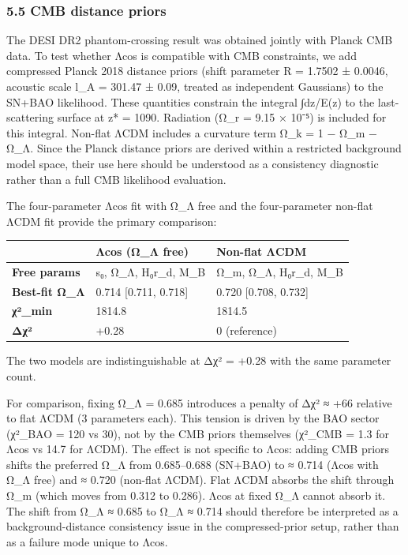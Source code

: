 \subsubsection{5.5 CMB distance priors}\label{cmb-distance-priors}

The DESI DR2 phantom-crossing result was obtained jointly with Planck
CMB data. To test whether Λcos is compatible with CMB constraints, we
add compressed Planck 2018 distance priors (shift parameter R = 1.7502 ±
0.0046, acoustic scale l\_A = 301.47 ± 0.09, treated as independent
Gaussians) to the SN+BAO likelihood. These quantities constrain the
integral ∫dz/E(z) to the last-scattering surface at z* = 1090. Radiation
(Ω\_r = 9.15 × 10⁻⁵) is included for this integral. Non-flat ΛCDM
includes a curvature term Ω\_k = 1 − Ω\_m − Ω\_Λ. Since the Planck
distance priors are derived within a restricted background model space,
their use here should be understood as a consistency diagnostic rather
than a full CMB likelihood evaluation.

The four-parameter Λcos fit with Ω\_Λ free and the four-parameter
non-flat ΛCDM fit provide the primary comparison:

{\def\LTcaptype{none} %
\begin{longtable}[]{@{}lll@{}}
\toprule\noalign{}
& Λcos (Ω\_Λ free) & Non-flat ΛCDM \\
\midrule\noalign{}
\endhead
\bottomrule\noalign{}
\endlastfoot
\textbf{Free params} & s₀, Ω\_Λ, H₀r\_d, M\_B & Ω\_m, Ω\_Λ, H₀r\_d,
M\_B \\
\textbf{Best-fit Ω\_Λ} & 0.714 {[}0.711, 0.718{]} & 0.720 {[}0.708,
0.732{]} \\
\textbf{χ²\_min} & 1814.8 & 1814.5 \\
\textbf{Δχ²} & +0.28 & 0 (reference) \\
\end{longtable}
}

The two models are indistinguishable at Δχ² = +0.28 with the same
parameter count.

For comparison, fixing Ω\_Λ = 0.685 introduces a penalty of Δχ² ≈ +66
relative to flat ΛCDM (3 parameters each). This tension is driven by the
BAO sector (χ²\_BAO = 120 vs 30), not by the CMB priors themselves
(χ²\_CMB = 1.3 for Λcos vs 14.7 for ΛCDM). The effect is not specific to
Λcos: adding CMB priors shifts the preferred Ω\_Λ from 0.685--0.688
(SN+BAO) to ≈ 0.714 (Λcos with Ω\_Λ free) and ≈ 0.720 (non-flat ΛCDM).
Flat ΛCDM absorbs the shift through Ω\_m (which moves from 0.312 to
0.286). Λcos at fixed Ω\_Λ cannot absorb it. The shift from Ω\_Λ ≈ 0.685
to Ω\_Λ ≈ 0.714 should therefore be interpreted as a background-distance
consistency issue in the compressed-prior setup, rather than as a
failure mode unique to Λcos.

